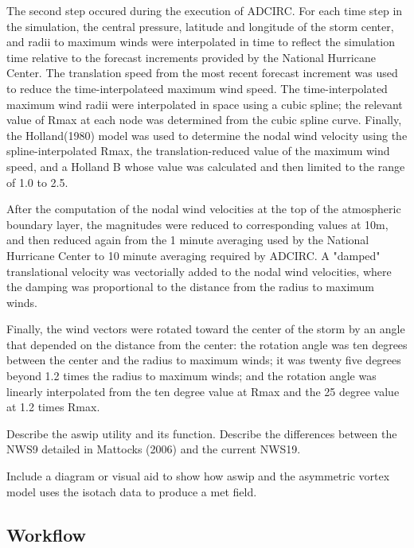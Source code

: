 \documentclass[jmse,article,submit,moreauthors,pdftex,12pt,a4paper]{mdpi}
\begin{document}
The second step occured during the execution of ADCIRC. For each 
time step in the simulation, the central pressure, latitude and 
longitude of the storm center, and radii to maximum winds were 
interpolated in time to reflect the simulation time relative to the 
forecast increments provided by the National Hurricane Center. The 
translation speed from the most recent forecast increment was used 
to reduce the time-interpolateed maximum wind speed. The 
time-interpolated maximum wind radii were interpolated in space 
using a cubic spline; the relevant value of Rmax at each node was 
determined from the cubic spline curve. Finally, the Holland(1980) 
model was used to determine the nodal wind velocity using the 
spline-interpolated Rmax, the translation-reduced value of the 
maximum wind speed, and a Holland B whose value was calculated and 
then limited to the range of 1.0 to 2.5.

After the computation of the nodal wind velocities at the top of the 
atmospheric boundary layer, the magnitudes were reduced to 
corresponding values at 10m, and then reduced again from the 1 
minute averaging used by the National Hurricane Center to 10 minute 
averaging required by ADCIRC. A "damped" translational velocity was 
vectorially added to the nodal wind velocities, where the damping 
was proportional to the distance from the radius to maximum winds.

Finally, the wind vectors were rotated toward the center of the 
storm by an angle that depended on the distance from the center: the 
rotation angle was ten degrees between the center and the radius to 
maximum winds; it was twenty five degrees beyond 1.2 times the 
radius to maximum winds; and the rotation angle was linearly 
interpolated from the ten degree value at Rmax and the 25 degree 
value at 1.2 times Rmax.

Describe the aswip utility and its function. Describe the 
differences between the NWS9 detailed in Mattocks (2006) and the 
current NWS19. 

Include a diagram or visual aid to show how aswip and the asymmetric 
vortex model uses the isotach data to produce a met field. 


\subsection{Workflow}
\end{document}
